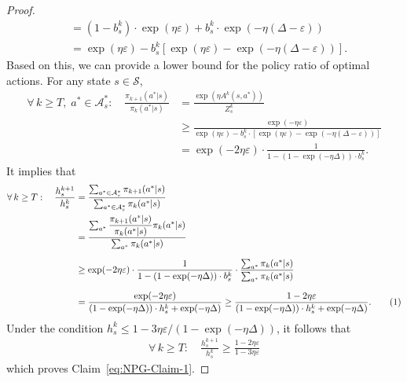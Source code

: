 \documentclass[10pt]{article}
\newcommand{\calA}{\mathcal{A}}
\newcommand{\calS}{\mathcal{S}}
\newcommand{\ls}{\left}
\newcommand{\rs}{\right}
\newcommand\numberthis{\addtocounter{equation}{1}\tag{\theequation}}
\theoremstyle{plain}
\theoremstyle{definition}
\begin{document}
\begin{proof}
\begin{align*}
        &= (1-b_s^k) \cdot \exp(\eta\varepsilon) + b_s^k \cdot \exp(-\eta(\Delta-\varepsilon)) \\[.5em]
        &= \exp(\eta \varepsilon) - b_s^k \ls[ \exp(\eta\varepsilon) - \exp(-\eta (\Delta - \varepsilon)) \rs].
    \end{align*}
    Based on this,  we can provide a lower bound for the policy ratio of optimal actions. For any state $s\in\calS$,
    \begin{align*}
        \forall\, k \geq T, \; a^*\in\calA^*_s : \quad \frac{\pi_{k+1}(a^*|s)}{\pi_k(a^*|s)} &= \frac{\exp(\eta A^k(s,a^*))}{Z_s^k} \\
        &\geq \frac{\exp(-\eta\varepsilon)}{\exp(\eta\varepsilon) - b_s^k \cdot \ls[ \exp(\eta\varepsilon) - \exp(-\eta (\Delta - \varepsilon)) \rs]} \\[.7em]
        &= \exp(-2\eta\varepsilon) \cdot \frac{1}{1-(1-\exp(-\eta\Delta)) \cdot b_s^k}. 
    \end{align*}
    It implies that
    \begin{align*}
        \forall\, k \geq T: \quad \frac{h_s^{k+1}}{h_s^k} &= \frac{\sum_{a^*\in\calA^*_s} \pi_{k+1}(a^*|s)}{\sum_{a^*\in\calA^*_s} \pi_k(a^*|s)} \\
        &= \frac{\sum_{a^*} \dfrac{\pi_{k+1}(a^*|s)}{\pi_k(a^*|s)} \pi_k(a^*|s)}{\sum_{a^*} \pi_k(a^*|s)} \\[.7em]
        &\geq \exp(-2\eta\varepsilon) \cdot \frac{1}{1-(1-\exp(-\eta\Delta)) \cdot b_s^k} \cdot  \frac{\sum_{a^*} \pi_k(a^*|s)}{\sum_{a^*} \pi_k(a^*|s)} \\[.7em]
        &= \frac{\exp(-2\eta\varepsilon)}{(1-\exp(-\eta\Delta)) \cdot h_s^k  + \exp(-\eta\Delta)} \geq \frac{1-2\eta\varepsilon}{(1-\exp(-\eta\Delta)) \cdot h_s^k  + \exp(-\eta\Delta)}. \numberthis \label{eq:bound-of-h-k-ratio}
    \end{align*}
    Under the condition $h_s^k \leq 1 - 3\eta\varepsilon / (1-\exp(-\eta\Delta))$, it follows that
    \begin{align*}
        \forall\, k \geq T: \quad \frac{h_s^{k+1}}{h_s^k} \geq \frac{1-2\eta\varepsilon}{1-3\eta\varepsilon}
    \end{align*}
    which proves Claim~\ref{eq:NPG-Claim-1}.


\end{proof}
\end{document}
